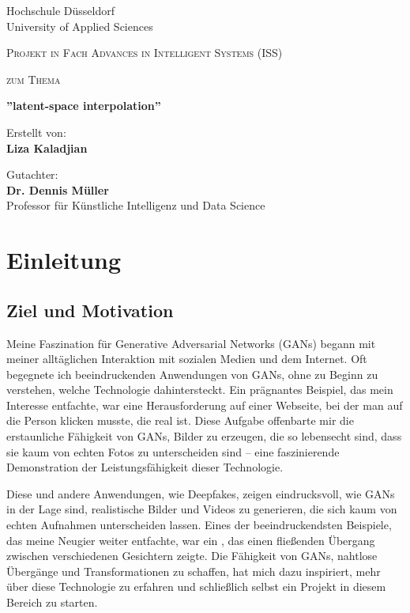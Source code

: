 \documentclass[a4paper, 12pt]{article}
\title{\haThema}
\author{\haAutor}
\date{\today}
\newcommand{\haThema}{”latent-space interpolation”}
\newcommand{\haAutor}{Liza Kaladjian}
\newcommand{\haDeckblattTextEins}{Projekt in Fach Advances in Intelligent Systems (ISS)}
\newcommand{\haGutachter}{Dr. Dennis Müller}
\newcommand{\haGutachterText}{Professor für Künstliche Intelligenz und Data Science}
\begin{document}
\begin{titlepage}
Hochschule Düsseldorf \\
University of Applied Sciences	
\begin{center}
\vspace{1.5cm}
{\scshape\large \haDeckblattTextEins \par}
\vspace{1cm}
{\scshape\large zum Thema\par}
\vspace{1.5cm}
{\LARGE\bfseries \haThema \par}
\vfill
{Erstellt von:\\ {\bfseries \haAutor} \par}
\vspace{1cm}
\vspace{1cm}
Gutachter:\\ {\bfseries \haGutachter}\\ \haGutachterText
\vfill
\end{center}
\end{titlepage}
\thispagestyle{empty}
\newpage

\tableofcontents
\thispagestyle{empty}
\newpage

\setcounter{page}{1}

\section{Einleitung}
\subsection{Ziel und Motivation}
Meine Faszination für Generative Adversarial Networks (GANs) begann mit meiner alltäglichen Interaktion mit sozialen Medien und dem Internet. Oft begegnete ich beeindruckenden Anwendungen von GANs, ohne zu Beginn zu verstehen, welche Technologie dahintersteckt. Ein prägnantes Beispiel, das mein Interesse entfachte, war eine Herausforderung auf einer Webseite, bei der man auf die Person klicken musste, die real ist. Diese Aufgabe offenbarte mir die erstaunliche Fähigkeit von GANs, Bilder zu erzeugen, die so lebensecht sind, dass sie kaum von echten Fotos zu unterscheiden sind – eine faszinierende Demonstration der Leistungsfähigkeit dieser Technologie.

Diese und andere Anwendungen, wie Deepfakes, zeigen eindrucksvoll, wie GANs in der Lage sind, realistische Bilder und Videos zu generieren, die sich kaum von echten Aufnahmen unterscheiden lassen. Eines der beeindruckendsten Beispiele, das meine Neugier weiter entfachte, war ein \cite{gif_example}, das einen fließenden Übergang zwischen verschiedenen Gesichtern zeigte. Die Fähigkeit von GANs, nahtlose Übergänge und Transformationen zu schaffen, hat mich dazu inspiriert, mehr über diese Technologie zu erfahren und schließlich selbst ein Projekt in diesem Bereich zu starten.
\end{document}
